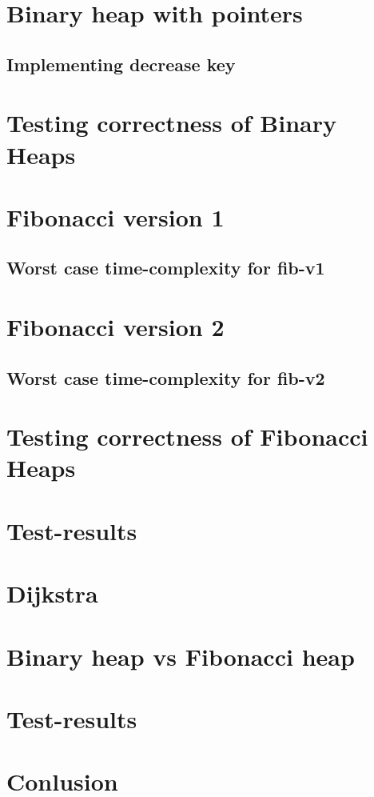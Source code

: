 \documentclass[12pt,a4paper,twoside,danish,article]{memoir}
\begin{document}
\chapter{Binary heap with pointers}

\section{Implementing decrease key}

\chapter{Testing correctness of Binary Heaps}

\chapter{Fibonacci version 1}

\section{Worst case time-complexity for fib-v1}

\chapter{Fibonacci version 2}

\section{Worst case time-complexity for fib-v2}

\chapter{Testing correctness of Fibonacci Heaps}

\chapter{Test-results}

\chapter{Dijkstra}

\chapter{Binary heap vs Fibonacci heap}

\chapter{Test-results}

\chapter{Conlusion}
\end{document}
